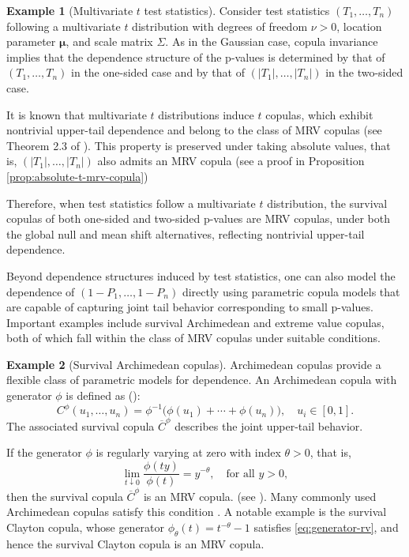 \documentclass[12pt]{article}
\theoremstyle{plain}
\theoremstyle{plain}
\theoremstyle{definition}
\newtheorem{exmp}{Example}[section]
\begin{document}
\begin{exmp}[Multivariate $t$ test statistics]
Consider test statistics $(T_1,\dots,T_n)$ following a multivariate $t$ distribution with degrees of freedom $\nu > 0$, location parameter $\bm\mu$, and scale matrix $\Sigma$. As in the Gaussian case, copula invariance implies that the dependence structure of the p-values is determined by that of $(T_1,\dots,T_n)$ in the one-sided case and by that of $(|T_1|,\dots,|T_n|)$ in the two-sided case.


It is known that multivariate $t$ distributions induce $t$ copulas, which exhibit nontrivial upper-tail dependence and belong to the class of MRV copulas (see Theorem 2.3 of \cite{nikoloulopoulos2009extreme}).
This property is preserved under taking absolute values, that is, $(|T_1|,\dots,|T_n|)$ also admits an MRV copula (see a proof in Proposition \ref{prop:absolute-t-mrv-copula})

Therefore, when test statistics follow a multivariate $t$ distribution, the survival copulas of both one-sided and two-sided p-values are MRV copulas, under both
the global null and mean shift alternatives, reflecting nontrivial upper-tail dependence.
\end{exmp}






Beyond dependence structures induced by test statistics, one can also model the dependence of $(1-P_1,\dots,1-P_n)$ directly using parametric copula models that are capable of capturing joint tail behavior corresponding to small p-values. Important examples include survival Archimedean and extreme value copulas, both of which fall within the class of MRV copulas under suitable conditions.

\begin{exmp}[Survival Archimedean copulas]
Archimedean copulas provide a flexible class of parametric models for dependence. An Archimedean copula with generator $\phi$ is defined as (\cite{nelsen2006introduction}):
\[
C^\phi(u_1,\dots,u_n)
= \phi^{-1}\Big(\phi(u_1)+\cdots+\phi(u_n)\Big), \quad u_i \in [0,1].
\]
The associated survival copula $\overline{C}^\phi$ describes the joint upper-tail behavior.


If the generator $\phi$ is regularly varying at zero with index $\theta>0$, that is,
\begin{equation}
\label{eq:generator-rv}
\lim_{t\downarrow0}\frac{\phi(ty)}{\phi(t)}=y^{-\theta}, \quad \text{for all } y>0,
\end{equation}
then the survival copula $\overline{C}^\phi$ is an MRV copula. (see \cite{embrechts2009additivity}). Many commonly used Archimedean copulas satisfy this condition \citep{weng2012characterization}. 
A notable example is the survival Clayton copula, whose generator $\phi_\theta(t)=t^{-\theta}-1$ satisfies \eqref{eq:generator-rv}, and hence the survival Clayton copula is an MRV copula.
\end{exmp}
\end{document}
